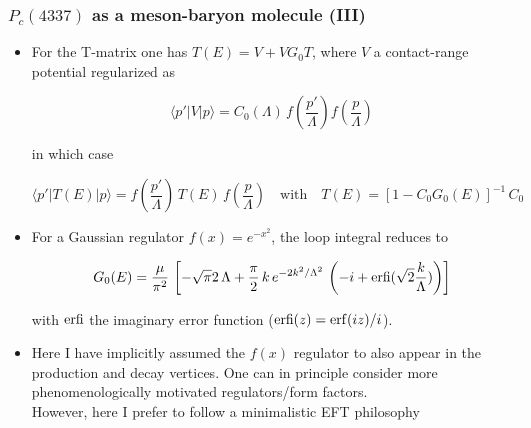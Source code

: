 \documentclass[utf8,10pt]{beamer}
\begin{document}
\begin{frame}
\frametitle{$P_{c}(4337)$ as a meson-baryon molecule (III)}

\begin{itemize}
\item For the T-matrix one has $T(E) = V + V G_0 T$, where $V$ a contact-range
  potential regularized as

  \vspace{-0.15cm}
  {\small $$
  \langle p' | V | p \rangle = C_0(\Lambda)\,
  f(\frac{p'}{\Lambda}) f(\frac{p}{\Lambda})
  $$}

  in which case

  \vspace{-0.25cm}
  {\small $$
  \langle p' | T(E) | p \rangle = f(\frac{p'}{\Lambda})\,T(E)\,f(\frac{p}{\Lambda}) \quad \mbox{with} \quad   T(E) = {\left[ 1 - C_0 G_0(E) \right]}^{-1}\,C_0
  $$}

\item For a Gaussian regulator $f(x) = e^{-x^2}$, the loop integral reduces to

       {\small
         $$
         G_0(E) = \frac{\mu}{\pi^2}\,\left[ -\sqrt{\pi}{2}\,\Lambda
           + \frac{\pi}{2}\,k\,e^{-2 k^2/\Lambda^2}\,\left( -i +
           {\rm erfi}(\sqrt{2}\frac{k}{\Lambda}) \right)
           \right]
         $$}  

       with ${\rm erfi}$ the imaginary error function
       (${\rm erfi}(z) = {\rm erf}(i z)/i$).
       
     \item Here I have implicitly assumed the $f(x)$ regulator to also appear
       in the production and decay vertices. One can in principle consider
       more phenomenologically motivated regulators/form factors. \\
       {\scriptsize However, here I prefer to follow a
         minimalistic EFT philosophy}
  
\end{itemize}

\end{frame}
\end{document}
